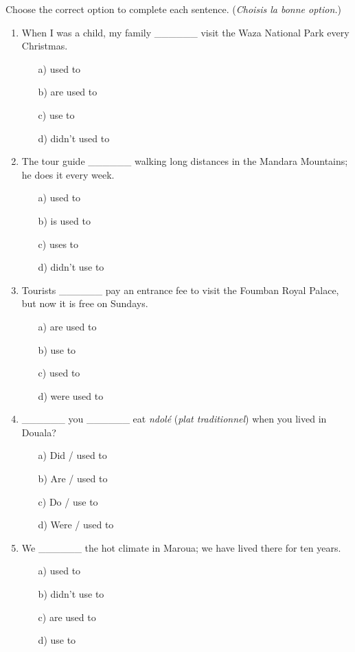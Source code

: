 \documentclass[11pt]{article}
\begin{document}
\begin{exercice}
Choose the correct option to complete each sentence. (\emph{Choisis la bonne option.})
\begin{enumerate}
    \item When I was a child, my family \_\_\_\_\_\_ visit the Waza National Park every Christmas.
    \begin{itemize}
        \item[a)] used to \item[b)] are used to \item[c)] use to \item[d)] didn't used to
    \end{itemize}
    \item The tour guide \_\_\_\_\_\_ walking long distances in the Mandara Mountains; he does it every week.
    \begin{itemize}
        \item[a)] used to \item[b)] is used to \item[c)] uses to \item[d)] didn't use to
    \end{itemize}
    \item Tourists \_\_\_\_\_\_ pay an entrance fee to visit the Foumban Royal Palace, but now it is free on Sundays.
    \begin{itemize}
        \item[a)] are used to \item[b)] use to \item[c)] used to \item[d)] were used to
    \end{itemize}
    \item \_\_\_\_\_\_ you \_\_\_\_\_\_ eat \textit{ndolé} (\textit{plat traditionnel}) when you lived in Douala?
    \begin{itemize}
        \item[a)] Did / used to \item[b)] Are / used to \item[c)] Do / use to \item[d)] Were / used to
    \end{itemize}
    \item We \_\_\_\_\_\_ the hot climate in Maroua; we have lived there for ten years.
    \begin{itemize}
        \item[a)] used to \item[b)] didn't use to \item[c)] are used to \item[d)] use to
    \end{itemize}
\end{enumerate}
\end{exercice}
\end{document}
